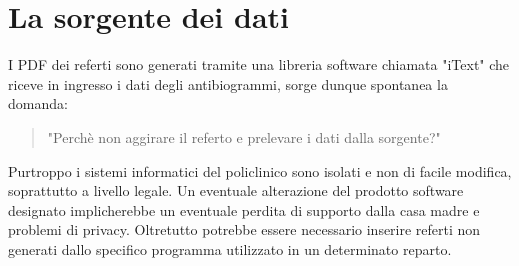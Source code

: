 \section{La sorgente dei dati}
I PDF dei referti sono generati tramite una libreria software chiamata "iText" che riceve in ingresso i dati degli antibiogrammi, sorge dunque spontanea la domanda: 
\begin{quotation}
  "Perchè non aggirare il referto e prelevare i dati dalla sorgente?"
\end{quotation}
Purtroppo i sistemi informatici del policlinico sono isolati e non di facile modifica, soprattutto a livello legale. Un eventuale alterazione del prodotto software designato implicherebbe un eventuale perdita di supporto dalla casa madre e problemi di privacy. Oltretutto potrebbe essere necessario inserire referti non generati dallo specifico programma utilizzato in un determinato reparto.




